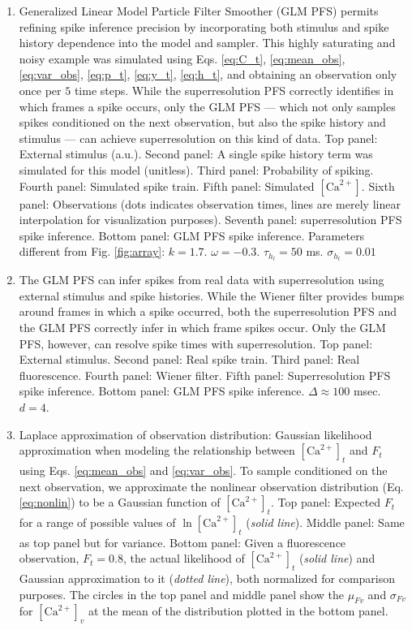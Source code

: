 \documentclass[10pt]{article}
\newcommand{\Ca}{[\text{Ca}^{2+}]}
\begin{document}
\begin{enumerate}
\item Generalized Linear Model Particle Filter Smoother (GLM PFS) permits refining spike inference precision by incorporating both stimulus and spike history dependence into the model and sampler. This highly saturating and noisy example was simulated using Eqs. \ref{eq:C_t}, \ref{eq:mean_obs}, \ref{eq:var_obs}, \ref{eq:p_t}, \ref{eq:y_t}, \ref{eq:h_t}, and obtaining an observation only once per $5$ time steps. While the superresolution PFS correctly identifies in which frames a spike occurs, only the GLM PFS --- which not only samples spikes conditioned on the next observation, but also the spike history and stimulus --- can achieve superresolution on this kind of data. Top panel: External stimulus (a.u.).  Second panel: A single spike history term was simulated for this model (unitless). Third panel: Probability of spiking.  Fourth panel: Simulated spike train.  Fifth panel: Simulated $\Ca$.  Sixth panel: Observations (dots indicates observation times, lines are merely linear interpolation for visualization purposes). Seventh panel: superresolution PFS spike inference.  Bottom panel: GLM PFS spike inference.  Parameters different from Fig. \ref{fig:array}: $k=1.7$. $\omega=-0.3$. $\tau_{h_l}=50$ ms. $\sigma_{h_l}=0.01$
\item The GLM PFS can infer spikes from real data with superresolution using external stimulus and spike histories.  While the Wiener filter provides bumps around frames in which a spike occurred, both the superresolution PFS and the GLM PFS correctly infer in which frame spikes occur.  Only the GLM PFS, however, can resolve spike times with superresolution. Top panel: External stimulus.  Second panel: Real spike train.  Third panel: Real fluorescence. Fourth panel: Wiener filter.  Fifth panel: Superresolution PFS spike inference.  Bottom panel: GLM PFS spike inference.  $\Delta \approx 100$ msec. $d=4$. 
\item Laplace approximation of observation distribution: Gaussian likelihood approximation when modeling the relationship between $\Ca_t$ and $F_t$ using Eqs. \ref{eq:mean_obs} and \ref{eq:var_obs}.  To sample conditioned on the next observation, we approximate the nonlinear observation distribution (Eq. \ref{eq:nonlin}) to be a Gaussian function of $\Ca_t$.  Top panel: Expected $F_t$ for a range of possible values of $\ln \Ca_t$ (\emph{solid line}).  Middle panel: Same as top panel but for variance. Bottom panel: Given a fluorescence observation, $F_t=0.8$, the actual likelihood of $\Ca_t$ (\emph{solid line}) and Gaussian approximation to it (\emph{dotted line}), both normalized for comparison purposes. The circles in the top panel and middle panel show the $\mu_{Fv}$ and $\sigma_{Fv}$ for $\Ca_v$ at the mean of the distribution plotted in the bottom panel.

\end{enumerate}
\end{document}
